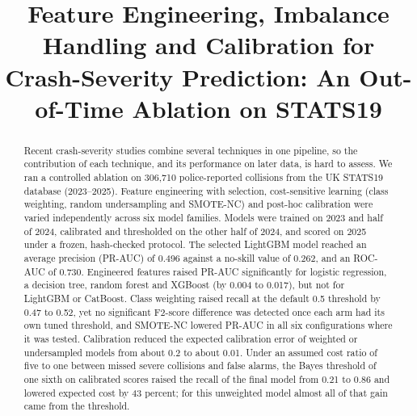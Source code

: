 \documentclass[conference,letterpaper]{IEEEtran}
\begin{document}
\title{Feature Engineering, Imbalance Handling and Calibration for Crash-Severity Prediction: An Out-of-Time Ablation on STATS19}

\author{
\and
{}
\and
{}
}

\maketitle

\begin{abstract}
Recent crash-severity studies combine several techniques in one pipeline, so the contribution of each technique, and its performance on later data, is hard to assess. We ran a controlled ablation on 306,710 police-reported collisions from the UK STATS19 database (2023--2025). Feature engineering with selection, cost-sensitive learning (class weighting, random undersampling and SMOTE-NC) and post-hoc calibration were varied independently across six model families. Models were trained on 2023 and half of 2024, calibrated and thresholded on the other half of 2024, and scored on 2025 under a frozen, hash-checked protocol. The selected LightGBM model reached an average precision (PR-AUC) of 0.496 against a no-skill value of 0.262, and an ROC-AUC of 0.730. Engineered features raised PR-AUC significantly for logistic regression, a decision tree, random forest and XGBoost (by 0.004 to 0.017), but not for LightGBM or CatBoost. Class weighting raised recall at the default 0.5 threshold by 0.47 to 0.52, yet no significant F2-score difference was detected once each arm had its own tuned threshold, and SMOTE-NC lowered PR-AUC in all six configurations where it was tested. Calibration reduced the expected calibration error of weighted or undersampled models from about 0.2 to about 0.01. Under an assumed cost ratio of five to one between missed severe collisions and false alarms, the Bayes threshold of one sixth on calibrated scores raised the recall of the final model from 0.21 to 0.86 and lowered expected cost by 43 percent; for this unweighted model almost all of that gain came from the threshold.
\end{abstract}
\end{document}
